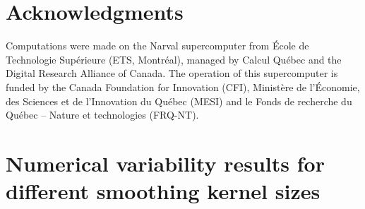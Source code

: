 \documentclass[lettersize,journal]{IEEEtran}
\begin{document}
\section*{Acknowledgments}

Computations were made on the Narval supercomputer from \'Ecole de Technologie
Sup\'erieure (ETS, Montr\'eal), managed by Calcul Québec and the Digital Research Alliance of Canada. The
operation of this supercomputer is funded by the Canada Foundation for
Innovation (CFI), Ministère de l’Économie, des Sciences et de l’Innovation du
Québec (MESI) and le Fonds de recherche du Québec – Nature et technologies
(FRQ-NT).




\appendix

\section*{Numerical variability results for different smoothing kernel sizes}
\label{appendix:numerical_uncertainty}

\end{document}
